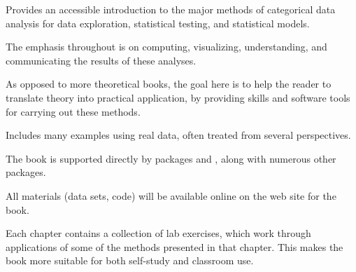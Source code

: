 \begin{itemize*}
	\item Provides an accessible introduction to the major methods of categorical data analysis
    for data exploration, statistical testing, and statistical models.
	\item The emphasis throughout is on computing, visualizing, understanding, and communicating
	  the results of these analyses.
  \item As opposed to more theoretical books, the goal here is to
    help the reader to translate theory into practical application, by providing skills and
    software tools for carrying out these methods.
	\item Includes many examples using real data, often treated from several perspectives.
	\item The book is supported directly by \R packages  and , along with numerous other \R packages.
	\item All materials (data sets, \R code) will be available online on the web site for the book.
  \item Each chapter contains a collection of lab exercises, which work through
    applications of some of the methods presented in that chapter.  This makes the book more suitable
    for both self-study and classroom use.
\end{itemize*}
